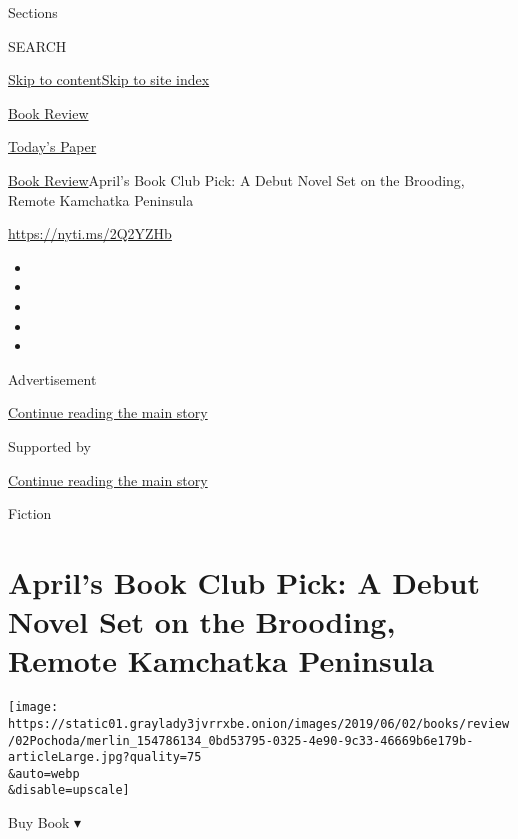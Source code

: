 Sections

SEARCH

\protect\hyperlink{site-content}{Skip to
content}\protect\hyperlink{site-index}{Skip to site index}

\href{https://www.nytimes3xbfgragh.onion/section/books/review}{Book
Review}

\href{https://myaccount.nytimes3xbfgragh.onion/auth/login?response_type=cookie\&client_id=vi}{}

\href{https://www.nytimes3xbfgragh.onion/section/todayspaper}{Today's
Paper}

\href{/section/books/review}{Book Review}\textbar{}April's Book Club
Pick: A Debut Novel Set on the Brooding, Remote Kamchatka Peninsula

\url{https://nyti.ms/2Q2YZHb}

\begin{itemize}
\item
\item
\item
\item
\item
\end{itemize}

Advertisement

\protect\hyperlink{after-top}{Continue reading the main story}

Supported by

\protect\hyperlink{after-sponsor}{Continue reading the main story}

Fiction

\hypertarget{aprils-book-club-pick-a-debut-novel-set-on-the-brooding-remote-kamchatka-peninsula}{%
\section{April's Book Club Pick: A Debut Novel Set on the Brooding,
Remote Kamchatka
Peninsula}\label{aprils-book-club-pick-a-debut-novel-set-on-the-brooding-remote-kamchatka-peninsula}}

\texttt{[image: https://static01.graylady3jvrrxbe.onion/images/2019/06/02/books/review/02Pochoda/merlin\_154786134\_0bd53795-0325-4e90-9c33-46669b6e179b-articleLarge.jpg?quality=75\\\&auto=webp\\\&disable=upscale]}

Buy Book ▾

